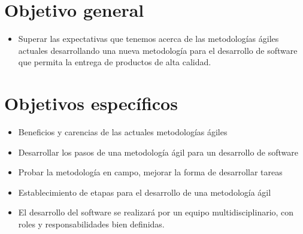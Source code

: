\section{Objetivo general}
	\begin{itemize}
		\item Superar las expectativas que tenemos acerca de las metodologías ágiles actuales desarrollando una nueva metodología para el desarrollo de software que permita la
		entrega de productos de alta calidad.
	\end{itemize}
	
\section{Objetivos específicos}
	\begin{itemize}
		\item Beneficios y carencias de las actuales metodologías ágiles
		\item Desarrollar los pasos de una metodología ágil para un desarrollo de software
		\item Probar la metodología en campo, mejorar la forma de desarrollar tareas
		\item Establecimiento de etapas para el desarrollo de una metodología ágil
		\item El desarrollo del software se realizará por un equipo multidisciplinario, con roles y responsabilidades bien definidas.
	\end{itemize}